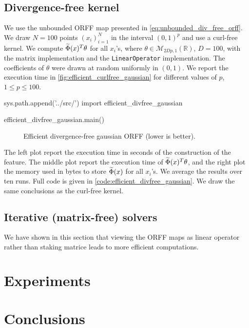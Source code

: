 \subsection{Divergence-free kernel}
We use the unbounded \acs{ORFF} map presented in \cref{eq:unbounded_div_free_orff}. We draw $N=100$ points $(x_i)_{i=1}^N$ in the interval $(0,1)^{p}$ and use a curl-free kernel. We compute $\widetilde{\Phi}(x)^T\theta$ for all $x_i$'s, where $\theta\in\mathcal{M}_{2Dp,1}(\mathbb{R})$, $D=100$, with the matrix implementation and the \texttt{LinearOperator} implementation. The coefficients of $\theta$ were drawn at random uniformly in $(0,1)$. We report the execution time in \cref{fig:efficient_curlfree_gaussian} for different values of $p$, $1\le p\le100$.
\begin{pycode}
sys.path.append('../src/')
import efficient_divfree_gaussian

efficient_divfree_gaussian.main()
\end{pycode}
\begin{figure}[htb]
\caption[Efficient divergence-free gaussian \acs{ORFF}]{Efficient divergence-free gaussian ORFF (lower is better).}
\label{fig:efficient_divfree_gaussian}
\end{figure}
The left plot report the execution time in seconds of the construction of the feature. The middle plot report the execution time of $\widetilde{\Phi}(x)^T\theta$, and the right plot the memory used in bytes  to store $\widetilde{\Phi}(x)$ for all $x_i$'s. We average the results over ten runs. Full code is given in \cref{code:efficient_divfree_gaussian}. We draw the same conclusions as the curl-free kernel.

\subsection{Iterative (matrix-free) solvers}
We have shown in this section that viewing the \acl{ORFF} maps as linear operator rather than staking matrice leads to more efficient computations.


\section{Experiments}


\section{Conclusions}
\label{sec:conclusions_learning}

\chapterend
